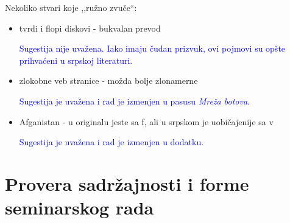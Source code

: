 \documentclass[a4paper]{report}
\newcommand{\odgovor}[1]{\textcolor{blue}{#1}}
\begin{document}
Nekoliko stvari koje ,,ružno zvuče``:
\begin{itemize}
  \item tvrdi i flopi diskovi - bukvalan prevod
  
  \odgovor{Sugestija nije uvažena. Iako imaju čudan prizvuk, ovi pojmovi su opšte prihvaćeni u srpskoj literaturi.}

  
  \item zlokobne veb stranice - možda bolje zlonamerne 
  
  \odgovor{Sugestija je uvažena i rad je izmenjen u pasusu \textit{Mreža botova}.}

  \item Afganistan - u originalu jeste sa f, ali u srpskom je uobičajenije sa v
  
  \odgovor{Sugestija je uvažena i rad je izmenjen u dodatku.}

\end{itemize}

\section{Provera sadržajnosti i forme seminarskog rada}
\end{document}
